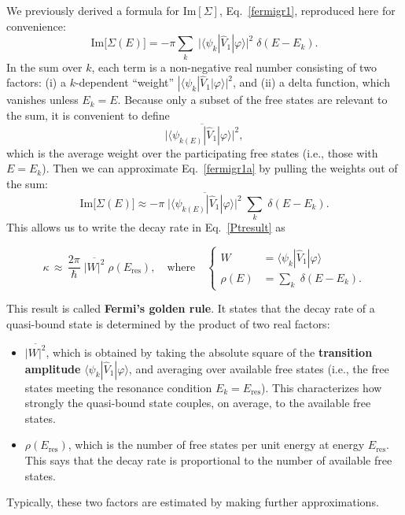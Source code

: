 \documentclass[pra,12pt]{revtex4-2}
\begin{document}
We previously derived a formula for $\mathrm{Im}[\Sigma]$,
Eq.~\eqref{fermigr1}, reproduced here for convenience:
\begin{equation}
  \mathrm{Im}\big[\Sigma(E)\big]
  = - \pi \sum_k \; \big| \langle\psi_k| \hat{V}_1|\varphi\rangle\big|^2
  \; \delta(E-E_k).
  \label{fermigr1a}
\end{equation}
In the sum over $k$, each term is a non-negative real number
consisting of two factors: (i) a $k$-dependent ``weight'' $|
\langle\psi_k| \hat{V}_1|\varphi\rangle|^2$, and (ii) a delta
function, which vanishes unless $E_k = E$.  Because only a subset of
the free states are relevant to the sum, it is convenient to define
\begin{equation*}
  \overline{\big| \langle\psi_{k(E)}| \hat{V}_1|\varphi\rangle\big|^2},
\end{equation*}
which is the average weight over the participating free states (i.e.,
those with $E = E_k$).  Then we can approximate Eq.~\eqref{fermigr1a}
by pulling the weights out of the sum:
\begin{equation}
  \mathrm{Im}\big[\Sigma(E)\big]
  \approx - \pi \;
  \overline{\big| \langle\psi_{k(E)}| \hat{V}_1|\varphi\rangle\big|^2}
  \; \sum_k \; \delta(E-E_k).
  \label{fermigr2}
\end{equation}
This allows us to write the decay rate in Eq.~\eqref{Ptresult} as
\begin{framed}
  \begin{equation}
    \kappa
    \,\approx\, \frac{2\pi}{\hbar} \;
    \overline{\big|W\big|^2} \; \rho(E_{\mathrm{res}}),
    \quad \mathrm{where} \quad \left\{
    \begin{aligned}
      W &= \langle\psi_{k}| \hat{V}_1|\varphi\rangle \\
      \rho(E) &= \sum_k \; \delta(E-E_k).
    \end{aligned}\right.
    \label{FGR}
  \end{equation}
\end{framed}
\vskip -0.1in
\noindent
This result is called \textbf{Fermi's golden rule}.  It states that
the decay rate of a quasi-bound state is determined by the product of
two real factors:

\begin{itemize}
\item
  $\overline{|W|^2}$, which is obtained by taking the absolute square
  of the \textbf{transition amplitude} $\langle\psi_{k}|
  \hat{V}_1|\varphi\rangle$, and averaging over available free states
  (i.e., the free states meeting the resonance condition $E_k =
  E_{\mathrm{res}}$).  This characterizes how strongly the quasi-bound
  state couples, on average, to the available free states.

\item
  $\rho(E_{\mathrm{res}})$, which is the number of free states per
  unit energy at energy $E_{\mathrm{res}}$.  This says that the decay
  rate is proportional to the number of available free states.
\end{itemize}
\vskip -0.1in
\noindent
Typically, these two factors are estimated by making further
approximations.
\end{document}
